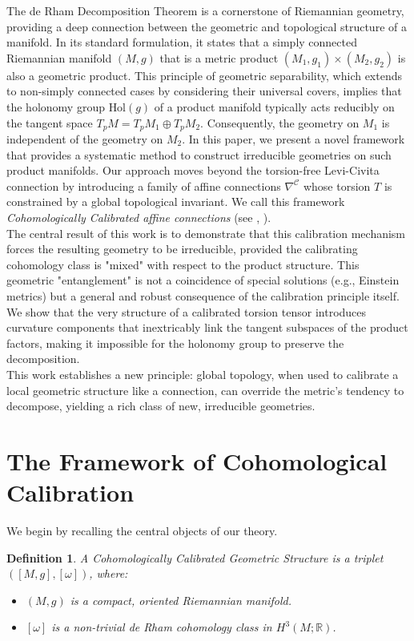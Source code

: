 \documentclass[12pt]{article}
\newtheorem{definition}{Definition}[section]
\begin{document}
The de Rham Decomposition Theorem is a cornerstone of Riemannian geometry, providing a deep connection between the geometric and topological structure of a manifold. In its standard formulation, it states that a simply connected Riemannian manifold $(M, g)$ that is a metric product $(M_1, g_1) \times (M_2, g_2)$ is also a geometric product. This principle of geometric separability, which extends to non-simply connected cases by considering their universal covers, implies that the holonomy group $\text{Hol}(g)$ of a product manifold typically acts reducibly on the tangent space $T_pM = T_pM_1 \oplus T_pM_2$. Consequently, the geometry on $M_1$ is independent of the geometry on $M_2$.
In this paper, we present a novel framework that provides a systematic method to construct irreducible geometries on such product manifolds. Our approach moves beyond the torsion-free Levi-Civita connection by introducing a family of affine connections $\nabla^{\mathcal{C}}$ whose torsion $T$ is constrained by a global topological invariant. We call this framework \emph{Cohomologically Calibrated affine connections} (see \cite{Pigazzini}, \cite{Pigazzini-Toda}).
\\
The central result of this work is to demonstrate that this calibration mechanism forces the resulting geometry to be irreducible, provided the calibrating cohomology class is "mixed" with respect to the product structure. This geometric "entanglement" is not a coincidence of special solutions (e.g., Einstein metrics) but a general and robust consequence of the calibration principle itself. We show that the very structure of a calibrated torsion tensor introduces curvature components that inextricably link the tangent subspaces of the product factors, making it impossible for the holonomy group to preserve the decomposition.
\\
This work establishes a new principle: global topology, when used to calibrate a local geometric structure like a connection, can override the metric's tendency to decompose, yielding a rich class of new, irreducible geometries.

\section{The Framework of Cohomological Calibration}

We begin by recalling the central objects of our theory.

\begin{definition} A Cohomologically Calibrated Geometric Structure is a triplet $([M, g], [\omega])$, where:
\begin{itemize}
\item $(M, g)$ is a compact, oriented Riemannian manifold.
\item$[\omega]$ is a non-trivial de Rham cohomology class in $H^3(M; \mathbb{R})$.
\end{itemize}    
\end{definition} 
\end{document}
